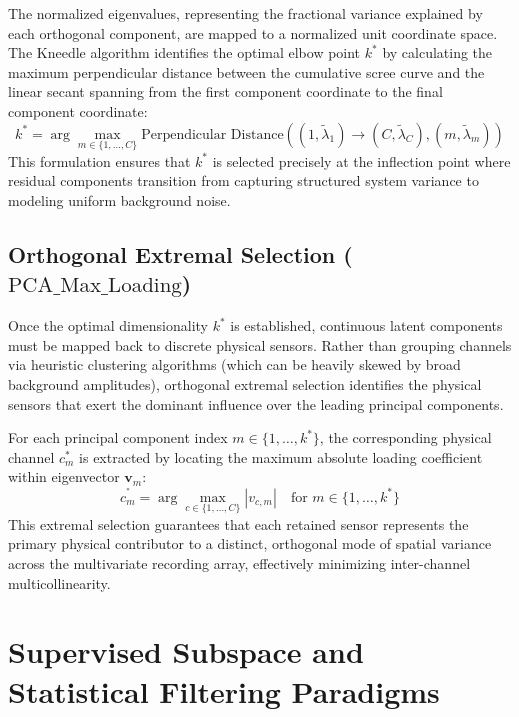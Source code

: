 \noindent
The normalized eigenvalues, representing the fractional variance explained by each orthogonal component, are mapped to a normalized unit coordinate space. The Kneedle algorithm identifies the optimal elbow point $k^*$ by calculating the maximum perpendicular distance between the cumulative scree curve and the linear secant spanning from the first component coordinate to the final component coordinate:
\begin{equation}
    k^* = \arg\max_{m \in \{1, \dots, C\}} \text{Perpendicular Distance}\left(\left(1, \tilde{\lambda}_1\right) \to \left(C, \tilde{\lambda}_C\right), \left(m, \tilde{\lambda}_m\right)\right)
\end{equation}
This formulation ensures that $k^*$ is selected precisely at the inflection point where residual components transition from capturing structured system variance to modeling uniform background noise.

\subsection{Orthogonal Extremal Selection ($\text{PCA\_Max\_Loading}$)}
\noindent
Once the optimal dimensionality $k^*$ is established, continuous latent components must be mapped back to discrete physical sensors. Rather than grouping channels via heuristic clustering algorithms (which can be heavily skewed by broad background amplitudes), orthogonal extremal selection identifies the physical sensors that exert the dominant influence over the leading principal components.

\noindent
For each principal component index $m \in \{1, \dots, k^*\}$, the corresponding physical channel $c_m^*$ is extracted by locating the maximum absolute loading coefficient within eigenvector $\mathbf{v}_m$:
\begin{equation}
    c_m^^* = \arg\max_{c \in \{1, \dots, C\}} \left| v_{c, m} \right| \quad \text{for } m \in \{1, \dots, k^*\}
\end{equation}
This extremal selection guarantees that each retained sensor represents the primary physical contributor to a distinct, orthogonal mode of spatial variance across the multivariate recording array, effectively minimizing inter-channel multicollinearity.

\section{Supervised Subspace and Statistical Filtering Paradigms}
\label{sec:supervised_paradigms}

